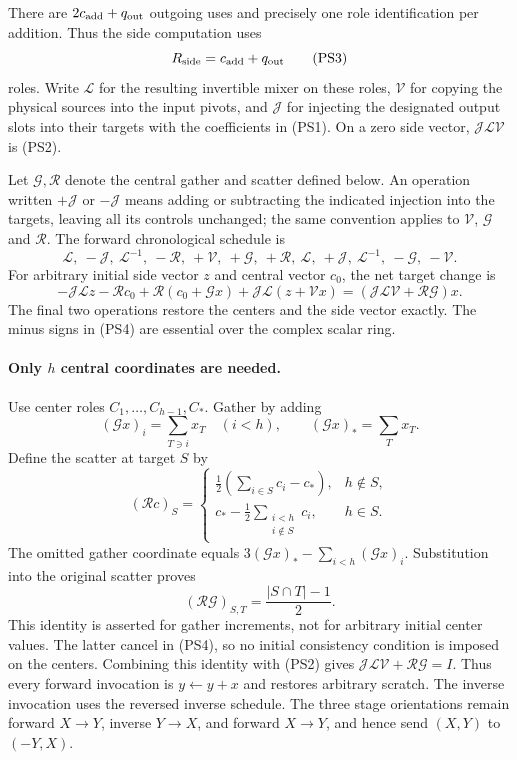 There are $2c_{\rm add}+q_{\rm out}$ outgoing uses and precisely one
role identification per addition.  Thus the side computation uses
\[
 R_{\rm side}=c_{\rm add}+q_{\rm out}                            \tag{PS3}
\]
roles.  Write $\mathcal L$ for the resulting invertible mixer on these
roles, $\mathcal V$ for copying the physical sources into the input
pivots, and $\mathcal J$ for injecting the designated output slots into
their targets with the coefficients in (PS1).  On a zero side vector,
$\mathcal J\mathcal L\mathcal V$ is (PS2).

Let $\mathcal G,\mathcal R$ denote the central gather and scatter defined
below.  An operation written $+\mathcal J$ or $-\mathcal J$ means adding
or subtracting the indicated injection into the targets, leaving all its
controls unchanged; the same convention applies to $\mathcal V$,
$\mathcal G$ and $\mathcal R$.  The forward chronological schedule is
\[
 \mathcal L,\ -\mathcal J,\ \mathcal L^{-1},\ -\mathcal R,\
 +\mathcal V,\ +\mathcal G,\ +\mathcal R,\
 \mathcal L,\ +\mathcal J,\ \mathcal L^{-1},\
 -\mathcal G,\ -\mathcal V.                                   \tag{PS4}
\]
For arbitrary initial side vector $z$ and central vector $c_0$, the net
target change is
\[
 -\mathcal J\mathcal Lz-\mathcal Rc_0
 +\mathcal R(c_0+\mathcal Gx)
 +\mathcal J\mathcal L(z+\mathcal Vx)
 =(\mathcal J\mathcal L\mathcal V+\mathcal R\mathcal G)x.
\]
The final two operations restore the centers and the side vector exactly.
The minus signs in (PS4) are essential over the complex scalar ring.

\paragraph{Only $h$ central coordinates are needed.}
Use center roles $C_1,\ldots,C_{h-1},C_\ast$.  Gather by adding
\[
 (\mathcal Gx)_i=\sum_{T\ni i}x_T\quad(i<h),\qquad
 (\mathcal Gx)_\ast=\sum_Tx_T.
\]
Define the scatter at target $S$ by
\[
 (\mathcal Rc)_S=
 \begin{cases}
 \displaystyle\frac12\left(\sum_{i\in S}c_i-c_\ast\right),
                                    &h\notin S,\\[6pt]
 \displaystyle c_\ast-\frac12
                  \sum_{\substack{i<h\\i\notin S}}c_i,
                                    &h\in S.
 \end{cases}                                                     \tag{PS5}
\]
The omitted gather coordinate equals
$3(\mathcal Gx)_\ast-\sum_{i<h}(\mathcal Gx)_i$.  Substitution into
the original scatter proves
\[
 (\mathcal R\mathcal G)_{S,T}=\frac{|S\cap T|-1}{2}.
\]
This identity is asserted for gather increments, not for arbitrary initial
center values.  The latter cancel in (PS4), so no initial consistency
condition is imposed on the centers.  Combining this identity with (PS2)
gives $\mathcal J\mathcal L\mathcal V+\mathcal R\mathcal G=I$.
Thus every forward invocation is $y\gets y+x$ and restores arbitrary
scratch.  The inverse invocation uses the reversed inverse schedule.
The three stage orientations remain forward $X\to Y$, inverse $Y\to X$,
and forward $X\to Y$, and hence send $(X,Y)$ to $(-Y,X)$.

